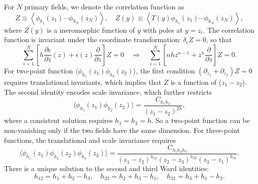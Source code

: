 \documentclass[aps,prb,superscriptaddress,nofootinbib]{revtex4}
\begin{document}
For $N$ primary fields, we denote the correlation function as 
\begin{equation}
	Z \equiv \left\langle \phi_{h_1}(z_1)\cdots\phi_{h_N}(z_N)\right\rangle,\quad
	Z(y)\equiv \left\langle T(y) \phi_{h_1}(z_1)\cdots\phi_{h_N}(z_N)\right\rangle,
\end{equation}
where $Z(y)$ is a meromorphic function of $y$ with poles at $y=z_i$. 
The correlation function is invariant under the coordinate transformation: $\delta_{\epsilon}Z=0$, so that
\begin{equation}
	\sum_{i=1}^N \left[h \frac{\partial \epsilon}{\partial z}(z) +\epsilon(z) \frac{\partial}{\partial z}\right]Z = 0 
	\quad\Longrightarrow\quad
	\sum_{i=1}^N \left[n h z^{n-1} +z^n \frac{\partial}{\partial z}\right]Z = 0.
\end{equation}
For two-point function $\langle\phi_{h_1}(z_1)\phi_{h_2}(z_2)\rangle$, the first condition $(\partial_{z_1}+\partial_{z_2})Z=0$ requires translational invariants, which implies that $Z$ is a function of ($z_1-z_2$).
The second identity encodes scale invariance, which further restricts 
\begin{equation}
	\langle\phi_{h_1}(z_1)\phi_{h_2}(z_2)\rangle = \frac{C_{h_1h_2}}{(z_1-z_2)^{2h}},
\end{equation}
where a consistent solution requires $h_1=h_2=h$.
So a two-point function can be non-vanishing only if the two fields have the same dimension. 
For three-point functions, the translational and scale invariance requires 
\begin{equation}
	\langle \phi_{h_1}(z_1)\phi_{h_2}(z_2)\phi_{h_3}(z_3)\rangle
	= \frac{C_{h_1 h_2 h_3}}{(z_1-z_2)^{h_{12}} (z_2-z_3)^{h_{23}} (z_3-z_1)^{h_{31}}}.
\end{equation}
There is a unique solution to the second and third Ward identities:
\begin{equation}
	h_{12} = h_1+h_2-h_3,\quad
	h_{23} = h_2+h_3-h_1,\quad
	h_{31} = h_3+h_1-h_2.
\end{equation}
\end{document}
